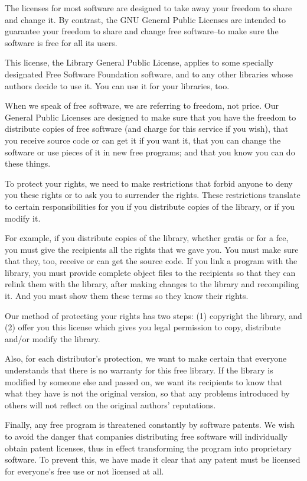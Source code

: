 \documentclass[twoside]{tceusermanual}
\begin{document}
The licenses for most software are designed to take away your
freedom to share and change it.  By contrast, the GNU General
Public Licenses are intended to guarantee your freedom to share
and change free software--to make sure the software is free for
all its users.

This license, the Library General Public License, applies to
some specially designated Free Software Foundation software, and
to any other libraries whose authors decide to use it.  You can
use it for your libraries, too.

When we speak of free software, we are referring to freedom, not
price.  Our General Public Licenses are designed to make sure
that you have the freedom to distribute copies of free software
(and charge for this service if you wish), that you receive
source code or can get it if you want it, that you can change
the software or use pieces of it in new free programs; and that
you know you can do these things.

To protect your rights, we need to make restrictions that forbid
anyone to deny you these rights or to ask you to surrender the
rights. These restrictions translate to certain responsibilities
for you if you distribute copies of the library, or if you
modify it.

For example, if you distribute copies of the library, whether
gratis or for a fee, you must give the recipients all the rights
that we gave you.  You must make sure that they, too, receive or
can get the source code.  If you link a program with the
library, you must provide complete object files to the
recipients so that they can relink them with the library, after
making changes to the library and recompiling it.  And you must
show them these terms so they know their rights.

Our method of protecting your rights has two steps: (1)
copyright the library, and (2) offer you this license which
gives you legal permission to copy, distribute and/or modify the
library.

Also, for each distributor's protection, we want to make certain
that everyone understands that there is no warranty for this
free library.  If the library is modified by someone else and
passed on, we want its recipients to know that what they have is
not the original version, so that any problems introduced by
others will not reflect on the original authors' reputations.
 
Finally, any free program is threatened constantly by software
patents.  We wish to avoid the danger that companies
distributing free software will individually obtain patent
licenses, thus in effect transforming the program into
proprietary software.  To prevent this, we have made it clear
that any patent must be licensed for everyone's free use or not
licensed at all.
\end{document}
